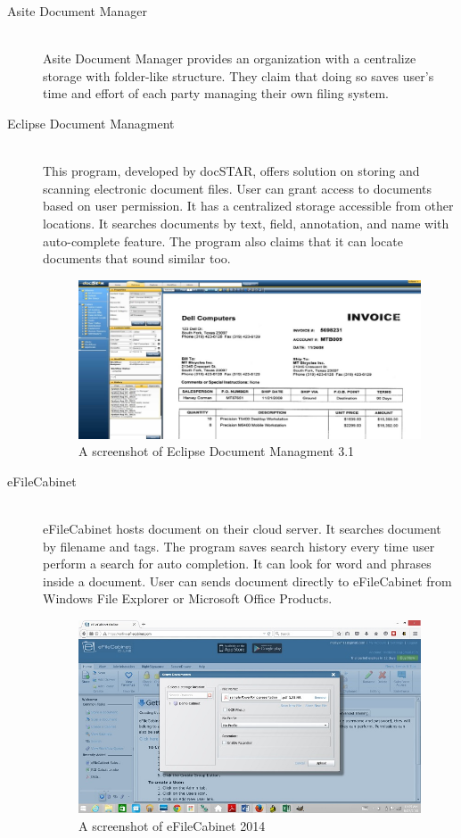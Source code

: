 \begin{description}
\item[Asite Document Manager] \hfill \\
Asite Document Manager provides an organization with a centralize storage with folder-like structure.
They claim that doing so saves user's time and effort of each party managing their own filing system.

\item[Eclipse Document Managment] \hfill \\
This program, developed by docSTAR, offers solution on storing and scanning electronic document files.
User can grant access to documents based on user permission.
It has a centralized storage accessible from other locations.
It searches documents by text, field, annotation, and name with auto-complete feature.
The program also claims that it can locate documents that sound similar too.
\begin{figure}[h]
	\centering
	\includegraphics[scale=0.8]{res/literature/screenshot_docstar}
	\caption{A screenshot of Eclipse Document Managment 3.1 \cite{docstar}}
\end{figure}

\item[eFileCabinet] \hfill \\
eFileCabinet hosts document on their cloud server.
It searches document by filename and tags.
The program saves search history every time user perform a search for auto completion.
It can look for word and phrases inside a document.
User can sends document directly to eFileCabinet from Windows File Explorer or Microsoft Office Products.
\begin{figure}[h]
	\centering
	\includegraphics[scale=0.7]{res/literature/screenshot_efilecabinet}
	\caption{A screenshot of eFileCabinet 2014 \cite{efilecabinet}}
\end{figure}


\end{description}
